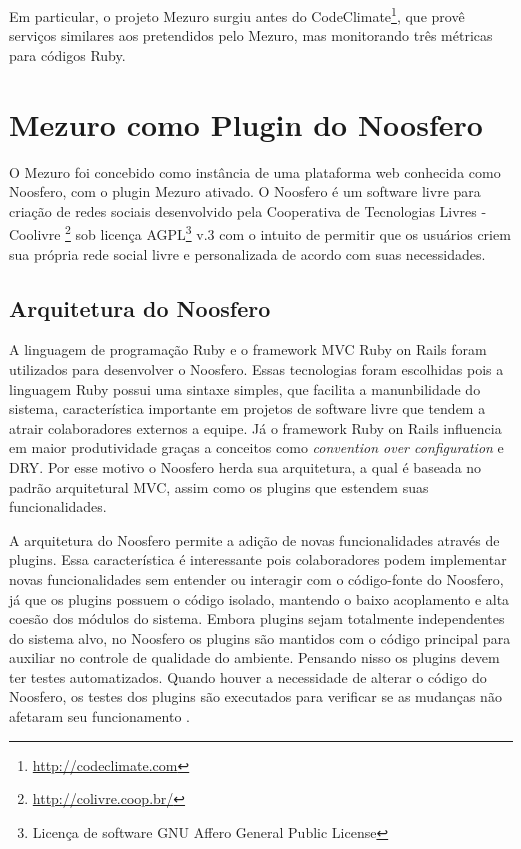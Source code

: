 Em particular, o projeto Mezuro surgiu antes do CodeClimate\footnote{\url{http://codeclimate.com}}, que provê serviços similares aos pretendidos pelo Mezuro, mas monitorando três métricas para códigos Ruby.



\section{Mezuro como Plugin do Noosfero}

O Mezuro foi concebido como instância de uma plataforma web conhecida como Noosfero, com o plugin Mezuro ativado. O Noosfero é um software livre para criação de redes sociais desenvolvido pela Cooperativa de Tecnologias Livres - Coolivre \footnote{\url{http://colivre.coop.br/}} sob licença AGPL\footnote{Licença de software GNU Affero General Public License} v.3 com o intuito de permitir que os usuários criem sua própria rede social livre e personalizada de acordo com suas necessidades.

\subsection{Arquitetura do Noosfero}

A linguagem de programação Ruby e o framework MVC Ruby on Rails foram utilizados para desenvolver o Noosfero. Essas tecnologias foram escolhidas pois a linguagem Ruby possui uma sintaxe simples, que facilita a manunbilidade do sistema, característica importante em projetos de software livre que tendem a atrair colaboradores externos a equipe. Já o framework Ruby on Rails influencia em maior produtividade graças a conceitos como \textit{convention over configuration} e DRY. Por esse motivo o Noosfero herda sua arquitetura, a qual é baseada no padrão arquitetural MVC, assim como os plugins que estendem suas funcionalidades.

A arquitetura do Noosfero permite a adição de novas funcionalidades através de plugins. Essa característica é interessante pois colaboradores podem implementar novas funcionalidades sem entender ou interagir com o código-fonte do Noosfero, já que os plugins possuem o código isolado, mantendo o baixo acoplamento e alta coesão dos módulos do sistema. Embora plugins sejam totalmente independentes do sistema alvo, no Noosfero os plugins são mantidos com o código principal para auxiliar no controle de qualidade do ambiente. Pensando nisso os plugins devem ter testes automatizados. Quando houver a necessidade de alterar o código do Noosfero, os testes dos plugins são executados para verificar se as mudanças não afetaram seu funcionamento \cite{noosfero2013plugins}.


